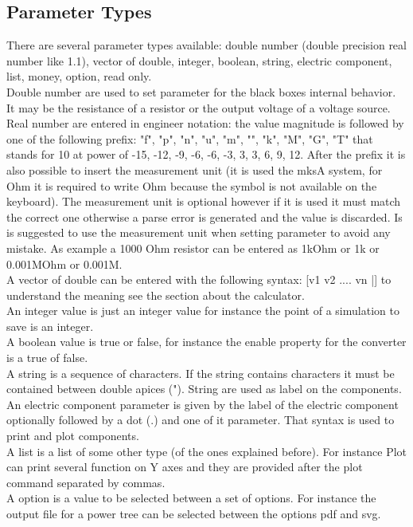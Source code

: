 \documentclass[12pt,a4paper]{book}
\begin{document}
\subsection{Parameter Types}
There are several parameter types available: double number (double precision real number like 1.1), vector of double, integer, boolean, string, electric component, list, money, option, read only.\\
Double number are used to set parameter for the black boxes internal behavior. It may be the resistance of a resistor or the output voltage of a voltage source. Real number are entered in engineer notation: the value magnitude is followed by one of the following prefix: "f", "p", "n", "u", "m", "", "k", "M", "G", "T" that stands for 10 at power of -15, -12, -9, -6, -6, -3, 3, 3, 6, 9, 12. After the prefix it is also possible to insert the measurement unit (it is used the mksA system, for Ohm it is required to write Ohm because the symbol is not available on the keyboard). The measurement unit is optional however if it is used it must match the correct one otherwise a parse error is generated and the value is discarded. Is is suggested to use the measurement unit when setting parameter to avoid any mistake. As example a 1000 Ohm resistor can be entered as 1kOhm or 1k or 0.001MOhm or 0.001M.\\
A vector of double can be entered with the following syntax: [v1 v2 .... vn |] to understand the meaning see the section about the calculator.\\
An integer value is just an integer value for instance the point of a simulation to save is an integer.\\
A boolean value is true or false, for instance the enable property for the converter is a true of false.\\
A string is a sequence of characters. If the string contains characters it must be contained between double apices ("). String are used as label on the components.\\
An electric component parameter is given by the label of the electric component optionally followed by a dot (.) and one of it parameter. That syntax is used to print and plot components.\\
A list is a list of some other type (of the ones explained before). For instance Plot can print several function on Y axes and they are provided after the plot command separated by commas.\\
A option is a value to be selected between a set of options. For instance the output file for a power tree can be selected between the options pdf and svg. \\
\end{document}
